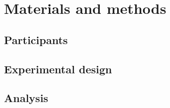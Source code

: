 \documentclass[10pt]{article}
\begin{document}




\section*{Materials and methods}
\subsection*{Participants}

\subsection*{Experimental design}

\subsection*{Analysis}



\end{document}
